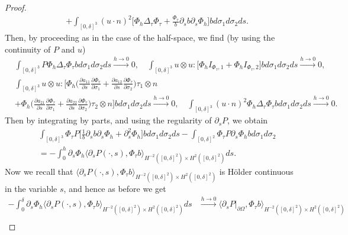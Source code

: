 \documentclass[12pt,a4paper]{article}
\theoremstyle{definition}
\theoremstyle{remark}
\numberwithin{equation}{section}
\begin{document}
\begin{proof}
\begin{align*}
&+ \int_{[0,\delta]^3} (u \cdot n)^2 \bigg[ \Phi_h \Delta_\tau \Phi_\tau + \frac{\Phi_\tau}{b} \partial_s b \partial_s \Phi_h \bigg] b d \sigma_1 d\sigma_2 ds.
\end{align*}
Then, by proceeding as in the case of the half-space, we find (by using the continuity of $P$ and $u$)
\begin{align*}
&\int_{[0,\delta]^3} P \Phi_h \Delta_\tau \Phi_\tau b d \sigma_1 d \sigma_2 ds \xrightarrow[]{h \rightarrow 0} 0, \quad \int_{[0,\delta]^3} u \otimes u : \bigg[ \Phi_h I_{\Phi_\tau,1} + \Phi_h I_{\Phi_\tau,2}  \bigg] b d \sigma_1 d\sigma_2 ds \xrightarrow[]{h \rightarrow 0} 0, \\
&\int_{[0,\delta]^3} u \otimes u : \bigg[ \Phi_h \bigg( \frac{\partial a_{11}}{\partial s} \frac{\partial \Phi_\tau}{\partial \sigma_1 } + \frac{\partial a_{12}}{\partial s} \frac{\partial \Phi_\tau}{\partial \sigma_2} \bigg) \tau_1 \otimes n \\
&+ \Phi_h \bigg( \frac{\partial a_{21}}{\partial s} \frac{\partial \Phi_\tau}{\partial \sigma_1 } + \frac{\partial a_{22}}{\partial s} \frac{\partial \Phi_\tau}{\partial \sigma_2 } \bigg) \tau_2 \otimes n \bigg] b d \sigma_1 d\sigma_2 ds \xrightarrow[]{h \rightarrow 0} 0, \quad \int_{[0,\delta]^3} (u \cdot n)^2 \Phi_h \Delta_\tau \Phi_\tau b d \sigma_1 d\sigma_2 ds \xrightarrow[]{h \rightarrow 0} 0.
\end{align*}
Then by integrating by parts, and using the regularity of $\partial_s P$, we obtain
\begin{align*}
&\int_{[0,\delta]^3} \Phi_\tau P \bigg[\frac{1}{b} \partial_s b \partial_s \Phi_h + \partial_s^2 \Phi_h \bigg] b d \sigma_1 d\sigma_2 ds - \int_{[0,\delta]^2} \Phi_\tau P \partial_s \Phi_h b d \sigma_1 d \sigma_2 \\
&= - \int_0^h \partial_s \Phi_h \langle \partial_s P (\cdot, s), \Phi_\tau b \rangle_{H^{-2} ([0,\delta]^2) \times H^2 ([0,\delta]^2)} ds.
\end{align*}
Now we recall that $\langle \partial_s P (\cdot, s), \Phi_\tau b \rangle_{H^{-2} ([0,\delta]^2) \times H^2 ([0,\delta]^2)}$ is Hölder continuous in the variable $s$, and hence as before we get
\begin{align*}
- \int_0^\delta \partial_s \Phi_h \langle \partial_s P (\cdot, s), \Phi_\tau b \rangle_{H^{-2} ([0,\delta]^2) \times H^2 ([0,\delta]^2)} ds &\xrightarrow[]{h \rightarrow 0} \langle \partial_s P \lvert_{\partial \Omega} , \Phi_\tau b \rangle_{H^{-2} ([0,\delta]^2) \times H^2 ([0,\delta]^2)} \\

\end{align*}
\end{proof}
\end{document}
